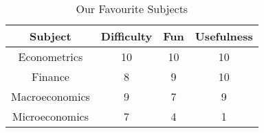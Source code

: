 \begin{table}[!h]
\centering
\caption{Our Favourite Subjects}
\begin{tabular}[!h]{c | c | c | c }
\hline
Subject & Difficulty & Fun & Usefulness\\ \hline
Econometrics & 10 & 10 & 10\\
Finance & 8 & 9 & 10\\
Macroeconomics & 9 & 7 & 9\\
Microeconomics & 7 & 4 & 1\\
\hline
\end{tabular}
\end{table}
